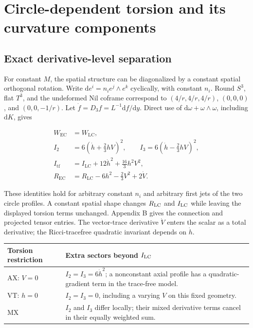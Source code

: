 \section{Circle-dependent torsion and its curvature components}

\subsection{Exact derivative-level separation}

For constant $M$, the spatial structure can be diagonalized by a constant spatial orthogonal rotation. Write $\mathrm{d}e^i=n_i e^j\wedge e^k$ cyclically, with constant $n_i$. Round $S^3$, flat $T^3$, and the undeformed Nil coframe correspond to $(4/r,4/r,4/r)$, $(0,0,0)$, and $(0,0,-1/r)$. Let $\dot f=D_3f=L^{-1}\mathrm{d}f/\mathrm{d}y$. Direct use of $\mathrm{d}\omega+\omega\wedge\omega$, including $\mathrm{d}K$, gives

\begin{equation}\tag{D-01}\label{eq:D-01}
\begin{aligned}
W_{\mathrm{EC}}&=W_{\mathrm{LC}},\\
I_2&=6\left(\dot h+\frac23 hV\right)^2,\qquad
I_3=6\left(\dot h-\frac23 hV\right)^2,\\
I_{\mathrm{tf}}&=I_{\mathrm{LC}}+12\dot h^2+\frac{16}{3}h^2V^2,\\
R_{\mathrm{EC}}&=R_{\mathrm{LC}}-6h^2-\frac23V^2+2\dot V.
\end{aligned}
\end{equation}

These identities hold for arbitrary constant $n_i$ and arbitrary first jets of the two circle profiles. A constant spatial shape changes $R_{\rm LC}$ and $I_{\rm LC}$ while leaving the displayed torsion terms unchanged. Appendix B gives the connection and projected tensor entries. The vector-trace derivative $\dot V$ enters the scalar as a total derivative; the Ricci-tracefree quadratic invariant depends on $\dot h$.

\begin{longtable}{@{}>{\raggedright\arraybackslash}p{}>{\raggedright\arraybackslash}p{}@{}}
\toprule
\textbf{Torsion restriction} & \textbf{Extra sectors beyond $I_{\rm LC}$} \\ \midrule
\endhead

AX: $V=0$ & $I_2=I_3=6\dot h^2$; a nonconstant axial profile has a quadratic-gradient term in the trace-free model. \\[4pt]

VT: $h=0$ & $I_2=I_3=0$, including a varying $V$ on this fixed geometry. \\[4pt]

MX & $I_2$ and $I_3$ differ locally; their mixed derivative terms cancel in their equally weighted sum. \\[4pt]

\bottomrule\end{longtable}

